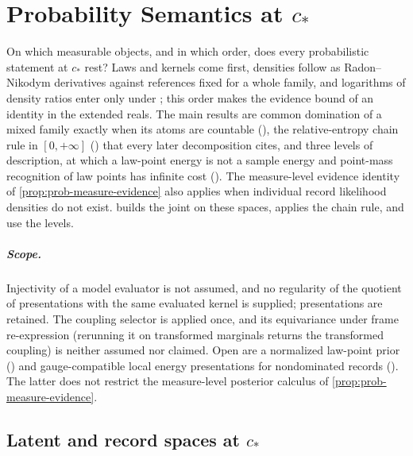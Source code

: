 \chapter{Probability Semantics at \texorpdfstring{$c_*$}{c*}}
\label{ch:probability}

On which measurable objects, and in which order, does every probabilistic statement at $c_*$ rest? Laws
and kernels come first, densities follow as Radon--Nikodym derivatives against references fixed for a
whole family, and logarithms of density ratios enter only under
; this order makes the evidence bound of  an
identity in the extended reals. The main results are common domination of a mixed family exactly when its
atoms are countable (), the relative-entropy chain rule in
$[0,+\infty]$ () that every later decomposition cites, and three levels of
description, at which a law-point energy is not a sample energy and point-mass recognition of law points
has infinite cost ().
The measure-level evidence identity of \cref{prop:prob-measure-evidence}
also applies when individual record likelihood densities do not exist.
 builds the joint on these spaces,  applies the chain rule, and
 use the levels.

\paragraph{Scope.}
Injectivity of a model evaluator is not assumed, and no regularity of the quotient of presentations with
the same evaluated kernel is supplied; presentations are retained. The coupling selector is applied once,
and its equivariance under frame re-expression (rerunning it on transformed marginals returns the
transformed coupling) is neither assumed nor claimed. Open are a normalized law-point prior
() and gauge-compatible local energy
presentations for nondominated records ().
The latter does not restrict the measure-level posterior calculus of
\cref{prop:prob-measure-evidence}. 

\section{Latent and record spaces at \texorpdfstring{$c_*$}{c*}}
\label{sec:prob-design}

